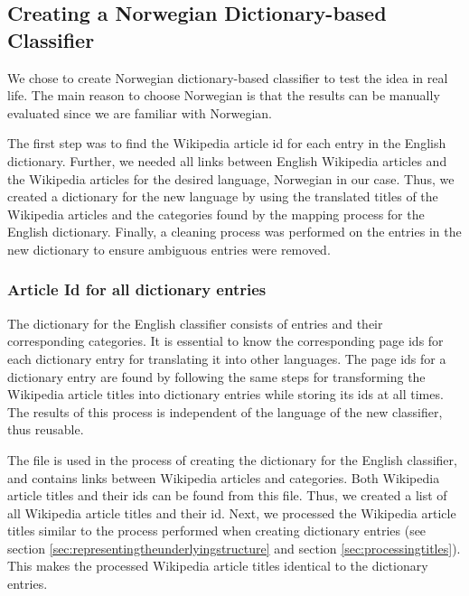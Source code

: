 
\subsection{Creating a Norwegian Dictionary-based Classifier}
\label{sec:creating_a_norwegian_dictionary_based_classifier}
We chose to create Norwegian dictionary-based classifier to test the idea in real life. The main reason to choose Norwegian is that the results can be manually evaluated since we are familiar with Norwegian.

The first step was to find the Wikipedia article id for each entry in the English dictionary. Further, we needed all links between English Wikipedia articles and the Wikipedia articles for the desired language, Norwegian in our case. Thus, we created a dictionary for the new language by using the translated titles of the Wikipedia articles and the categories found by the mapping process for the English dictionary. Finally, a cleaning process was performed on the entries in the new dictionary to ensure ambiguous entries were removed. 


\subsubsection{Article Id for all dictionary entries}
The dictionary for the English classifier consists of entries and their corresponding categories. It is essential to know the corresponding page ids for each dictionary entry for translating it into other languages. The page ids for a dictionary entry are found by following the same steps for transforming the Wikipedia article titles into dictionary entries while storing its ids at all times. The results of this process is independent of the language of the new classifier, thus reusable.


The file \enwikicatlink is used in the process of creating the dictionary for the English classifier, and contains links between Wikipedia articles and categories. Both Wikipedia article titles and their ids can be found from this file. Thus, we created a list of all Wikipedia article titles and their id. Next, we processed  the Wikipedia article titles similar to the process performed when creating dictionary entries (see section \ref{sec:representingtheunderlyingstructure} and section \ref{sec:processingtitles}). This makes the processed Wikipedia article titles identical to the dictionary entries. 


